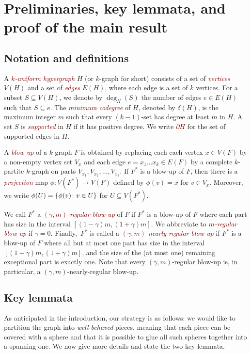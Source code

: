 \documentclass[12pt,reqno]{amsart}
\theoremstyle{plain}
\theoremstyle{definition}
\numberwithin{equation}{section}
\DeclarePairedDelimiter{\set}{\{}{\}}
\renewcommand{\subset}{\subseteq}
\newcommand{\defn}[1]{\textcolor{Maroon}{\emph{#1}}}
\begin{document}
	
	\section{Preliminaries, key lemmata, and proof of the main result}
	\label{sec:preliminaries}
	
	\subsection{Notation and definitions}
	
	A \defn{$k$-uniform hypergraph} $H$ (or $k$-graph for short) consists of a set of \defn{vertices} $V(H)$ and a set of \defn{edges} $E(H)$, where each edge is a set of $k$ vertices.
	For a subset $S \subset V(H)$, we denote by  $\deg_H(S)$ the number of edges $e\in E(H)$ such that $S\subseteq e$.
	The \defn{minimum codegree} of $H$, denoted by $\delta(H)$, is the maximum integer $m$ such that every $(k - 1)$-set has degree at least $m$ in $H$.
	A set $S$ is \defn{supported} in $H$ if it has positive degree.
	We write \defn{$\partial H$} for the set of supported edges in $H$.
	
	A \defn{blow-up} of a $k$-graph $F$ is obtained by replacing each each vertex $x \in V(F)$ by a non-empty vertex set $V_x$ and each edge $e = x_1 \dotsc x_k \in E(F)$ by a complete $k$-partite $k$-graph on parts $V_{x_1}, V_{x_2}, \dotsc, V_{x_k}$. If $F^\ast$ is a blow-up of $F$, then there is a \defn{projection} map $\phi \colon V(F^\ast) \to V(F)$ defined by $\phi(v) = x$ for $v \in V_x$.
	Moreover, we write $\phi(U) = \set{\phi(v)\colon v \in U}$ for $U\subset V(F^\ast)$.
	
	
	We call $F^\ast$ a \defn{$(\gamma, m)$-regular blow-up} of $F$ if $F^\ast$ is a blow-up of $F$ where each part has size in the interval $[(1 - \gamma)m, (1 + \gamma)m]$.
	We abbreviate to \defn{$m$-regular blow-up} if $\gamma = 0$.
	Finally,~$F^\ast$ is called a \defn{$(\gamma,m)$-nearly-regular blow-up} if $F^\ast$ is a blow-up of $F$ where all but at most one part has size in the interval $[(1 - \gamma)m, (1 + \gamma)m]$, and the size of the (at most one) remaining exceptional part is exactly one. Note that every $(\gamma,m)$-regular blow-up is, in particular, a $(\gamma,m)$-nearly-regular blow-up.
	
	\subsection{Key lemmata}
	As anticipated in the introduction, our strategy is as follows: we would like to partition the graph into \emph{well-behaved} pieces, meaning that each piece can be covered with a sphere and that it is possible to glue all such spheres together into a spanning one.
	We now give more details and state the two key lemmata.
	
\end{document}
